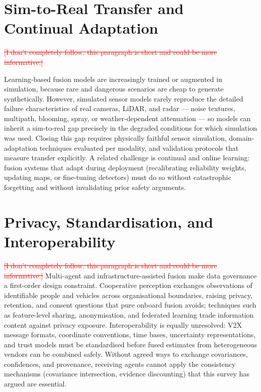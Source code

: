 \documentclass[11pt,oneside,openany]{book}
\newcommand{\deleted}[1]{\textcolor{red}{\sout{#1}}}
\begin{document}
{\color{blue}
\section{Sim-to-Real Transfer and Continual Adaptation}

\deleted{[I don't completely follow. this paragraph is short and could be more informative.]} %

Learning-based fusion models are increasingly trained or augmented in simulation, because rare and dangerous scenarios are cheap to generate synthetically. However, simulated sensor models rarely reproduce the detailed failure characteristics of real cameras, LiDAR, and radar --- noise textures, multipath, blooming, spray, or weather-dependent attenuation --- so models can inherit a sim-to-real gap precisely in the degraded conditions for which simulation was used. Closing this gap requires physically faithful sensor simulation, domain-adaptation techniques evaluated per modality, and validation protocols that measure transfer explicitly. A related challenge is continual and online learning: fusion systems that adapt during deployment (recalibrating reliability weights, updating maps, or fine-tuning detectors) must do so without catastrophic forgetting and without invalidating prior safety arguments.

\section{Privacy, Standardisation, and Interoperability}
\deleted{[I don't completely follow. this paragraph is short and could be more informative.]} %
Multi-agent and infrastructure-assisted fusion make data governance a first-order design constraint. Cooperative perception exchanges observations of identifiable people and vehicles across organisational boundaries, raising privacy, retention, and consent questions that pure onboard fusion avoids; techniques such as feature-level sharing, anonymisation, and federated learning trade information content against privacy exposure. Interoperability is equally unresolved: V2X message formats, coordinate conventions, time bases, uncertainty representations, and trust models must be standardised before fused estimates from heterogeneous vendors can be combined safely. Without agreed ways to exchange covariances, confidences, and provenance, receiving agents cannot apply the consistency mechanisms (covariance intersection, evidence discounting) that this survey has argued are essential.
}
\end{document}
